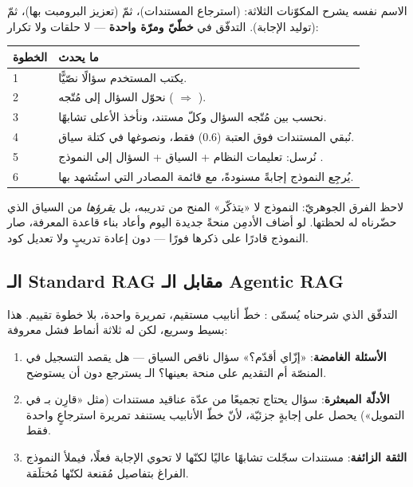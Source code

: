 الاسم نفسه يشرح المكوّنات الثلاثة:  (استرجاع المستندات)، ثمّ
 (تعزيز البرومبت بها)، ثمّ  (توليد الإجابة). التدفّق في
 \textbf{خطّيّ ومرّة واحدة} — لا حلقات ولا تكرار:

\begin{center}
\begin{tabular}{L{1.4cm} L{12.4cm}}
\toprule
\textbf{\color{spPrimary}الخطوة} & \textbf{\color{spPrimary}ما يحدث}\\
 & يكتب المستخدم سؤالًا نصّيًّا.\\
2 & نحوّل السؤال إلى مُتّجه ( $\Rightarrow$ ).\\
3 & نحسب  بين مُتّجه السؤال وكلّ مستند، ونأخذ الأعلى تشابهًا.\\
4 & نُبقي المستندات فوق العتبة (0.6) فقط، ونصوغها في كتلة سياق.\\
5 & نُرسل: تعليمات النظام + السياق + السؤال إلى النموذج .\\
6 & يُرجِع النموذج إجابةً مسنودةً، مع قائمة المصادر التي استُشهد بها.\\
\bottomrule
\end{tabular}
\end{center}

\begin{note}
لاحظ الفرق الجوهريّ: النموذج لا «يتذكّر» المنح من تدريبه، بل \emph{يقرؤها} من السياق
الذي حضّرناه له لحظتها. لو أضاف الأدمِن منحةً جديدة اليوم وأعاد بناء قاعدة المعرفة،
صار النموذج قادرًا على ذكرها فورًا — دون إعادة تدريبٍ ولا تعديل كود.
\end{note}

\subsection{الـ Standard RAG مقابل الـ Agentic RAG}

التدفّق الذي شرحناه يُسمّى : خطّ أنابيب مستقيم، تمريرة واحدة، بلا
خطوة تقييم. هذا بسيط وسريع، لكن له ثلاثة أنماط فشل معروفة:

\begin{enumerate}
  \item \textbf{الأسئلة الغامضة}: «إزّاي أقدّم؟» سؤال ناقص السياق — هل يقصد التسجيل في
    المنصّة أم التقديم على منحة بعينها؟ الـ  يسترجع دون أن يستوضح.
  \item \textbf{الأدلّة المبعثرة}: سؤال يحتاج تجميعًا من عدّة عناقيد مستندات (مثل «قارِن
     بـ  في التمويل») يحصل على إجابةٍ جزئيّة، لأنّ خطّ
    الأنابيب يستنفد تمريرة استرجاعٍ واحدة فقط.
  \item \textbf{الثقة الزائفة}: مستندات سجّلت تشابهًا عاليًا لكنّها لا تحوي الإجابة فعلًا،
    فيملأ النموذج الفراغ بتفاصيل مُقنعة لكنّها مُختلَقة.
\end{enumerate}

